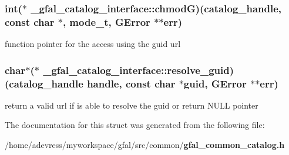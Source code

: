 \subsubsection{\setlength{\rightskip}{0pt plus 5cm}int($\ast$ \bf{\_\-gfal\_\-catalog\_\-interface::chmod\-G})(catalog\_\-handle, const char $\ast$, mode\_\-t, GError $\ast$$\ast$err)}\label{struct__gfal__catalog__interface_a2d423528930c419615115f14911238e}


function pointer for the access using the guid url 
\subsubsection{\setlength{\rightskip}{0pt plus 5cm}char$\ast$($\ast$ \bf{\_\-gfal\_\-catalog\_\-interface::resolve\_\-guid})(catalog\_\-handle handle, const char $\ast$guid, GError $\ast$$\ast$err)}\label{struct__gfal__catalog__interface_03064e4d29e97a4017d6a0797bfc6c77}


return a valid url if is able to resolve the guid or return NULL pointer 

The documentation for this struct was generated from the following file:\begin{CompactItemize}
\item 
/home/adevress/myworkspace/gfal/src/common/\bf{gfal\_\-common\_\-catalog.h}\end{CompactItemize}
